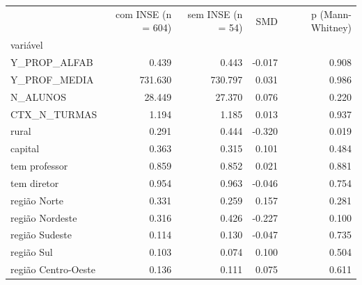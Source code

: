 \begin{tabular}{lrrrr}
\toprule
 & com INSE (n = 604) & sem INSE (n = 54) & SMD & p (Mann-Whitney) \\
variável &  &  &  &  \\
\midrule
Y\_PROP\_ALFAB & 0.439 & 0.443 & -0.017 & 0.908 \\
Y\_PROF\_MEDIA & 731.630 & 730.797 & 0.031 & 0.986 \\
N\_ALUNOS & 28.449 & 27.370 & 0.076 & 0.220 \\
CTX\_N\_TURMAS & 1.194 & 1.185 & 0.013 & 0.937 \\
rural & 0.291 & 0.444 & -0.320 & 0.019 \\
capital & 0.363 & 0.315 & 0.101 & 0.484 \\
tem professor & 0.859 & 0.852 & 0.021 & 0.881 \\
tem diretor & 0.954 & 0.963 & -0.046 & 0.754 \\
região Norte & 0.331 & 0.259 & 0.157 & 0.281 \\
região Nordeste & 0.316 & 0.426 & -0.227 & 0.100 \\
região Sudeste & 0.114 & 0.130 & -0.047 & 0.735 \\
região Sul & 0.103 & 0.074 & 0.100 & 0.504 \\
região Centro-Oeste & 0.136 & 0.111 & 0.075 & 0.611 \\
\bottomrule
\end{tabular}
